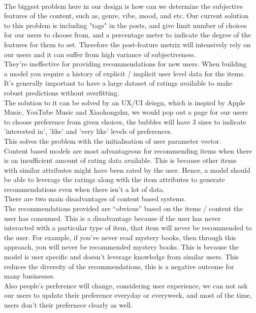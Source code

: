 \\The biggest problem here in our design is how can we determine the subjective features of the content, such as, genre, vibe, mood, and etc. Our current solution to this problem is including "tags" in the posts, and give limit number of choices for our users to choose from, 
and a percentage meter to indicate the degree of the features for them to set. Therefore the post-feature metrix will intensively rely on our users and it can suffer from high variance of subjectiveness.
\\They’re ineffective for providing recommendations for new users. When building a model you require a history of explicit / implicit user level data for the items. It’s generally important to have a large dataset of ratings available to make robust predictions without overfitting.
\\The solution to it can be solved by an UX/UI deisgn, which is inspird by Apple Music, YouTube Music and Xiaohongshu, we would pop out a page for our users to choose preference from given choices, the bubbles will have 3 sizes to indicate 'interested in', 'like' and 'very like' levels of preferences. 
\\This solves the problem with the initialisation of user parameter vector.
%
\\Content based models are most advantageous for recommending items when there is an insufficient amount of rating data available. This is because other items with similar attributes might have been rated by the user. Hence, a model should be able to leverage the ratings along with the item attributes to generate recommendations even when there isn’t a lot of data.
\\There are two main disadvantages of content based systems.
\\The recommendations provided are “obvious” based on the items / content the user has consumed. This is a disadvantage because if the user has never interacted with a particular type of item, that item will never be recommended to the user. For example, if you’ve never read mystery books, then through this approach, you will never be recommended mystery books. This is because the model is user specific and doesn’t leverage knowledge from similar users. This reduces the diversity of the recommendations, this is a negative outcome for many businesses.
\\Also people's perference will change, considering user experience, we can not ask our users to update their preference everyday or everyweek, 
and most of the time, users don't their prefernece clearly as well.

